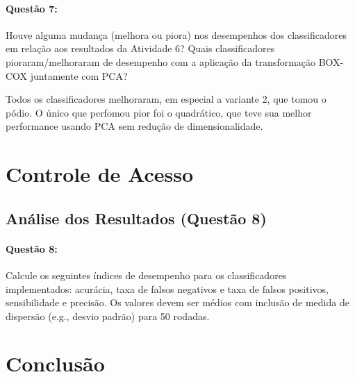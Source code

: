 \documentclass[a4paper, 12pt]{article}
\begin{document}
\paragraph{Questão 7:} Houve alguma mudança (melhora ou piora) nos desempenhos dos classificadores em relação aos resultados da Atividade 6? Quais classificadores pioraram/melhoraram de desempenho com a aplicação da transformação BOX-COX juntamente com PCA?


Todos os classificadores melhoraram, em especial a variante 2, que tomou o pódio. O único que perfomou pior
foi o quadrático, que teve sua melhor performance usando PCA sem redução de dimensionalidade.


\section{Controle de Acesso}
\subsection*{Análise dos Resultados (Questão 8)}
\paragraph{Questão 8:} Calcule os seguintes índices de desempenho para os classificadores implementados: acurácia, taxa de falsos negativos e taxa de falsos positivos, sensibilidade e precisão. Os valores devem ser médios com inclusão de medida de dispersão (e.g., desvio padrão) para 50 rodadas.

\section{Conclusão}
\end{document}
